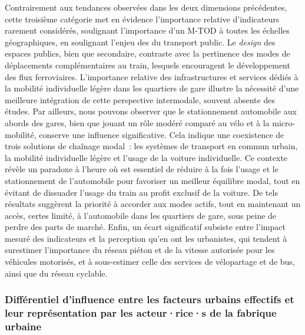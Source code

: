 \begin{refsegment}
Contrairement aux tendances observées dans les deux dimensions précédentes, cette troisième catégorie met en évidence l'importance relative d'indicateurs rarement considérés, soulignant l'importance d'un \acrshort{M-TOD} à toutes les échelles géographiques, en soulignant l'enjeu des  du transport public. Le \textsl{design} des espaces publics, bien que secondaire, contraste avec la pertinence des modes de déplacements complémentaires au train, lesquels encouragent le développement des flux ferroviaires. L'importance relative des infrastructures et services dédiés à la mobilité individuelle légère dans les quartiers de gare illustre la nécessité d'une meilleure intégration de cette perspective intermodale, souvent absente des études.  Par ailleurs, nous pouvons observer que le stationnement automobile aux abords des gares, bien que jouant un rôle modéré comparé au vélo et à la micro-mobilité, conserve une influence significative. Cela indique une coexistence de trois solutions de chaînage modal~: les systèmes de transport en commun urbain, la mobilité individuelle légère et l'usage de la voiture individuelle. Ce contexte révèle un paradoxe à l'heure où est essentiel de réduire à la fois l'usage et le stationnement de l'automobile pour favoriser un meilleur équilibre modal, tout en évitant de dissuader l'usage du train au profit exclusif de la voiture. De tels résultats suggèrent la priorité à accorder aux modes actifs, tout en maintenant un accès, certes limité, à l'automobile dans les quartiers de gare, sous peine de perdre des parts de marché. Enfin, un écart significatif subsiste entre l'impact mesuré des indicateurs et la perception qu'en ont les urbanistes, qui tendent à surestimer l'importance du réseau piéton et de la vitesse autorisée pour les véhicules motorisés, et à sous-estimer celle des services de vélopartage et de bus, ainsi que du réseau cyclable.%

\subsubsection*{Différentiel d'influence entre les facteurs urbains effectifs et leur représentation par les acteur·rice·s de la fabrique urbaine
    \label{chap6:results-ecarts-influence-indicateurs}
    }


\end{refsegment}
